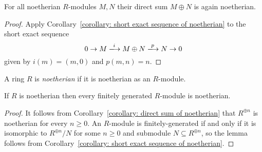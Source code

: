 \begin{corollary}
  \label{corollary: direct sum of noetherian}
  For all noetherian $R$-modules $M, N$ their direct sum $M \oplus N$ is again noetherian.
\end{corollary}


\begin{proof}
  Apply Corollary~\ref{corollary: short exact sequence of noetherian} to the short exact sequence
  \[
                        0
    \to                 M
    \xlongrightarrow{i} M \oplus N
    \xlongrightarrow{p} N
    \to                 0
  \]
  given by $i(m) = (m,0)$ and $p(m,n) = n$.
\end{proof}


\begin{definition}
  A ring $R$ is \emph{noetherian} if it is noetherian as an $R$-module.
\end{definition}


\begin{lemma}
  \label{lemma: finitely generated over notherian rings}
  If $R$ is noetherian then every finitely generated $R$-module is noetherian.
\end{lemma}


\begin{proof}
  It follows from Corollary~\ref{corollary: direct sum of noetherian} that $R^{\oplus n}$ is noetherian for every $n \geq 0$.
  An $R$-module is finitely-generated if and only if it is isomorphic to $R^{\oplus n}/N$ for some $n \geq 0$ and submodule $N \subseteq R^{\oplus n}$, so the lemma follows from Corollary~\ref{corollary: short exact sequence of noetherian}.
\end{proof}



